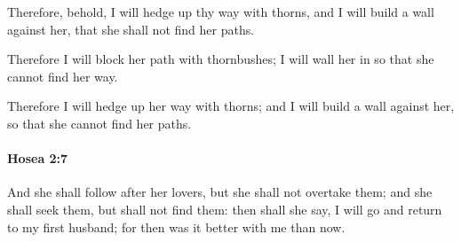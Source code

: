 			\begin{versebox}
					\item[BHS] 
					\item[LXX] 
					\item[ASV] Therefore, behold, I will hedge up thy way with thorns, and I will build a wall against her, that she shall not find her paths.
					\item[NIV] Therefore I will block her path with thornbushes; I will wall her in so that she cannot find her way.
					\item[NRSV] Therefore I will hedge up her way with thorns; and I will build a wall against her, so that she cannot find her paths.
			\end{versebox}

		\paragraph{Hosea 2:7} %
			\label{HOSEA-2-7}

			And she shall follow after her lovers, but she shall not overtake them; and she shall seek them, but shall not find them: then shall she say, I will go and return to my first husband; for then was it better with me than now.

